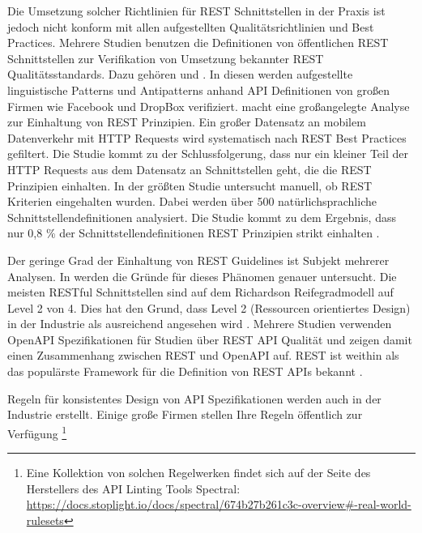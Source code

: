 Die Umsetzung solcher Richtlinien für \acs{REST} Schnittstellen in der Praxis ist jedoch nicht konform mit allen aufgestellten Qualitätsrichtlinien und Best Practices. Mehrere Studien benutzen die Definitionen von öffentlichen \acs{REST} Schnittstellen zur Verifikation von Umsetzung bekannter \acs{REST} Qualitätsstandards. Dazu gehören \parencite{palma_detection_2014} und \parencite{palma_semantic_2017}. In diesen werden aufgestellte linguistische Patterns und Antipatterns anhand \acs{API} Definitionen von großen Firmen wie Facebook und DropBox verifiziert. \parencite{rodriguez_rest_2016} macht eine großangelegte Analyse zur Einhaltung von \acs{REST} Prinzipien. Ein großer Datensatz an mobilem Datenverkehr mit \acs{HTTP} Requests wird systematisch nach \acs{REST} Best Practices gefiltert. Die Studie kommt zu der Schlussfolgerung, dass nur ein kleiner Teil der \acs{HTTP} Requests aus dem Datensatz an Schnittstellen geht, die die \acs{REST} Prinzipien einhalten. In der größten Studie untersucht \parencite{neumann_analysis_2021} manuell, ob \acs{REST} Kriterien eingehalten wurden. Dabei werden über 500 natürlichsprachliche Schnittstellendefinitionen analysiert. Die Studie kommt zu dem Ergebnis, dass nur 0,8 \% der Schnittstellendefinitionen \acs{REST} Prinzipien strikt einhalten \parencite{neumann_api_2017}. 

Der geringe Grad der Einhaltung von REST Guidelines ist Subjekt mehrerer Analysen. In \parencite{kotstein_which_2021} werden die Gründe für dieses Phänomen genauer untersucht. Die meisten \acs{REST}ful Schnittstellen sind auf dem Richardson Reifegradmodell auf Level 2 von 4. Dies hat den Grund, dass Level 2 (Ressourcen orientiertes Design) in der Industrie als ausreichend angesehen wird \parencite{kotstein_which_2021}. Mehrere Studien verwenden OpenAPI Spezifikationen für Studien über \acs{REST} \acs{API} Qualität \parencite{eriksson_using_2023}\parencite{bogner_restruler_2024} und zeigen damit einen Zusammenhang zwischen \acs{REST} und OpenAPI auf. \acs{REST} ist weithin als das populärste Framework für die Definition von \acs{REST} \acs{API}s bekannt \parencite{openapi_initiative_openapi_2024}.

Regeln für konsistentes Design von \acs{API} Spezifikationen werden auch in der Industrie erstellt. Einige große Firmen stellen Ihre Regeln öffentlich zur Verfügung \footnote{Eine Kollektion von solchen Regelwerken findet sich auf der Seite des Herstellers des API Linting Tools Spectral: \href{https://docs.stoplight.io/docs/spectral/674b27b261c3c-overview\#-real-world-rulesets}{https://docs.stoplight.io/docs/spectral/674b27b261c3c-overview\#-real-world-rulesets}} \parencite{stoplight_spectral_2024-2}


